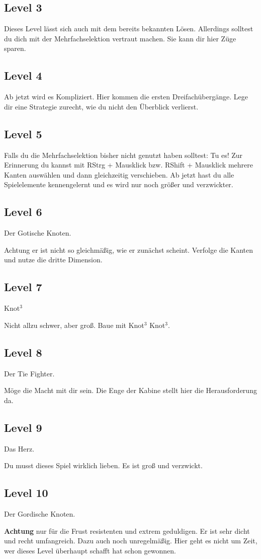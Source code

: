 \documentclass{scrartcl}
\begin{document}
\subsection*{Level 3}
Dieses Level lässt sich auch mit dem bereits bekannten Lösen. Allerdings solltest du dich mit der Mehrfachselektion vertraut machen. Sie kann dir hier Züge sparen.

\subsection*{Level 4}
Ab jetzt wird es Kompliziert. Hier kommen die ersten Dreifachübergänge. Lege dir eine Strategie zurecht, wie du nicht den Überblick verlierst.

\subsection*{Level 5}
Falls du die Mehrfachselektion bisher nicht genutzt haben solltest: Tu es!
Zur Erinnerung du kannst mit RStrg + Mausklick bzw. RShift + Mausklick mehrere Kanten auswählen und dann gleichzeitig verschieben.
Ab jetzt hast du alle Spielelemente kennengelernt und es wird nur noch größer und verzwickter.

\subsection*{Level 6}
Der Gotische Knoten.

Achtung er ist nicht so gleichmäßig, wie er zunächst scheint. Verfolge die Kanten und nutze die dritte Dimension.

\subsection*{Level 7}
Knot$^3$

Nicht allzu schwer, aber groß. Baue mit Knot$^3$ Knot$^3$.

\subsection*{Level 8}
Der Tie Fighter.

Möge die Macht mit dir sein. Die Enge der Kabine stellt hier die Herausforderung da.

\subsection*{Level 9}
Das Herz.

Du musst dieses Spiel wirklich lieben. Es ist groß und verzwickt.

\subsection*{Level 10}
Der Gordische Knoten.

{\bf Achtung} nur für die Frust resistenten und extrem geduldigen. Er ist sehr dicht und recht umfangreich. Dazu auch noch unregelmäßig. Hier geht es nicht um Zeit, wer dieses Level überhaupt schafft hat schon gewonnen.
\end{document}
